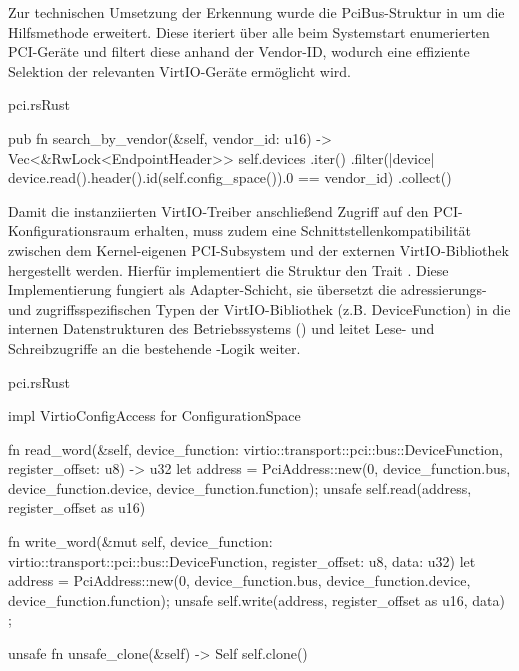 Zur technischen Umsetzung der Erkennung wurde die PciBus-Struktur in  um die Hilfsmethode  erweitert. Diese iteriert über alle beim Systemstart enumerierten PCI-Geräte und filtert diese anhand der Vendor-ID, wodurch eine effiziente Selektion der relevanten VirtIO-Geräte ermöglicht wird.

\begin{codeblock}{pci.rs}{Rust}
  \begin{rustcode}
pub fn search_by_vendor(&self, vendor_id: u16) -> Vec<&RwLock<EndpointHeader>> {
    self.devices
        .iter()
        .filter(|device| device.read().header().id(self.config_space()).0 == vendor_id)
        .collect()
}
  \end{rustcode}
\end{codeblock}

Damit die instanziierten VirtIO-Treiber anschließend Zugriff auf den PCI-Kon\-fi\-gu\-ra\-ti\-ons\-raum erhalten, muss zudem eine Schnittstellenkompatibilität zwischen dem Kernel-eigenen PCI-Subsystem und der externen VirtIO-Bibliothek hergestellt werden. Hierfür implementiert die Struktur  den Trait . Diese Implementierung fungiert als Adapter-Schicht, sie übersetzt die adressierungs- und zugriffsspezifischen Typen der VirtIO-Bibliothek (z.B. DeviceFunction) in die internen Datenstrukturen des Betriebssystems () und leitet Lese- und Schreibzugriffe an die bestehende -Logik weiter.

\begin{codeblock}{pci.rs}{Rust}
  \begin{rustcode}
impl VirtioConfigAccess for ConfigurationSpace {
    fn read_word(&self, device_function: virtio::transport::pci::bus::DeviceFunction, register_offset: u8) -> u32 {
        let address = PciAddress::new(0, device_function.bus, device_function.device, device_function.function);
        unsafe { self.read(address, register_offset as u16) }
    }

    fn write_word(&mut self, device_function: virtio::transport::pci::bus::DeviceFunction, register_offset: u8, data: u32) {
        let address = PciAddress::new(0, device_function.bus, device_function.device, device_function.function);
        unsafe { self.write(address, register_offset as u16, data) };
    }
    
    unsafe fn unsafe_clone(&self) -> Self {
        self.clone()
    }
}
  \end{rustcode}
\end{codeblock}

